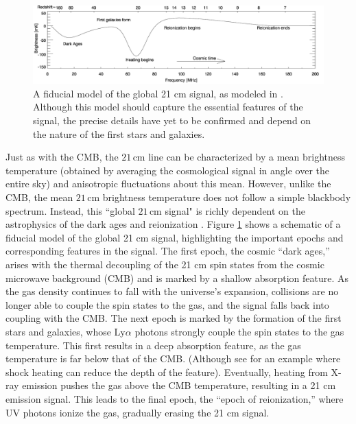 \documentclass[twocolumn,apj,numberedappendix]{emulateapj}
\begin{document}
\begin{figure}[!]
	\centering
	\includegraphics[width=1.00\textwidth] {figures/fidModel.png}
	\caption{A fiducial model of the global 21 cm signal, as modeled in \citet{PritchardLoeb2010}. Although this model should capture the essential features of the signal, the precise details have yet to be confirmed and depend on the nature of the first stars and galaxies.}
	\label{fig:21cmSignal}
\end{figure}

Just as with the CMB, the $21\,\textrm{cm}$ line can be characterized by a mean brightness temperature (obtained by averaging the cosmological signal in angle over the entire sky) and anisotropic fluctuations about this mean. However, unlike the CMB, the mean $21\,\textrm{cm}$ brightness temperature does not follow a simple blackbody spectrum. Instead, this ``global $21\,\textrm{cm}$ signal" is richly dependent on the astrophysics of the dark ages and reionization \citep{Shaver1999,PritchardLoeb2010,MorandiBarkana}. Figure \ref{fig:21cmSignal} shows a schematic of a fiducial model of the global 21 cm signal, highlighting the important epochs and corresponding features in the signal. The first epoch, the cosmic ``dark ages,'' arises with the thermal decoupling of the 21 cm spin states from the cosmic microwave background (CMB) and is marked by a shallow absorption feature. As the gas density continues to fall with the universe's expansion, collisions are no longer able to couple the spin states to the gas, and the signal falls back into coupling with the CMB. The next epoch is marked by the formation of the first stars and galaxies, whose Ly$\alpha$ photons strongly couple the spin states to the gas temperature. This first results in a deep absorption feature, as the gas temperature is far below that of the CMB. (Although see \citealt{GnedinShaver2004} for an example where shock heating can reduce the depth of the feature). Eventually, heating from X-ray emission pushes the gas above the CMB temperature, resulting in a 21 cm emission signal. This leads to the final epoch, the ``epoch of reionization,'' where UV photons ionize the gas, gradually erasing the 21 cm signal.
\end{document}
